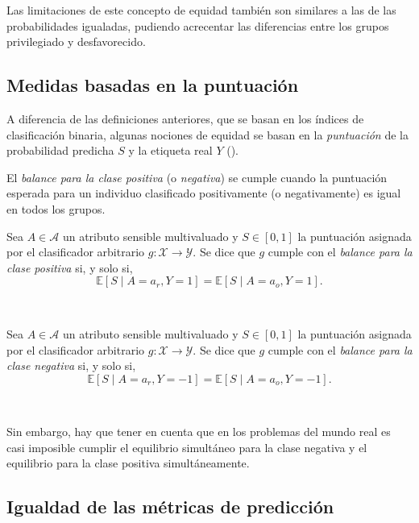 \documentclass[oneside,openright,titlepage,numbers=noenddot,openany,headinclude,footinclude=true,
cleardoublepage=empty,abstractoff,BCOR=5mm,paper=a4,fontsize=12pt,main=spanish]{scrreprt}
\begin{document}
Las limitaciones de este concepto de equidad también son similares a las de las probabilidades igualadas, pudiendo acrecentar las diferencias entre los grupos privilegiado y desfavorecido.

\subsection{Medidas basadas en la puntuación}

A diferencia de las definiciones anteriores, que se basan en los índices de clasificación binaria, algunas nociones de equidad se basan en la \textit{puntuación} de la probabilidad predicha $S$ y la etiqueta real $Y$ (\cite{catalogue2018}).

El \textit{balance para la clase positiva} (o \textit{negativa}) se cumple cuando la puntuación esperada para un individuo clasificado positivamente (o negativamente) es igual en todos los grupos.\\

\begin{definition}
Sea $A \in \mathcal{A}$ un atributo sensible multivaluado y $S\in [0,1]$ la puntuación asignada por el clasificador arbitrario $g\colon \mathcal{X} \to \mathcal{Y}$. Se dice que $g$ cumple con el \textit{balance para la clase positiva} si, y solo si, $$\mathbb{E}[S \mid A=a_r,Y=1]=\mathbb{E}[S \mid A=a_o,Y=1].$$
\end{definition}\

\begin{definition}
Sea $A \in \mathcal{A}$ un atributo sensible multivaluado y $S\in [0,1]$ la puntuación asignada por el clasificador arbitrario $g\colon \mathcal{X} \to \mathcal{Y}$. Se dice que $g$ cumple con el \textit{balance para la clase negativa} si, y solo si, $$\mathbb{E}[S \mid A=a_r, Y=-1]=\mathbb{E}[S \mid A=a_o, Y=-1].$$
\end{definition}\

Sin embargo, hay que tener en cuenta que
en los problemas del mundo real es casi imposible cumplir el equilibrio simultáneo para la clase negativa y el equilibrio para la clase positiva simultáneamente.

\clearpage

\subsection{Igualdad de las métricas de predicción}
\end{document}
